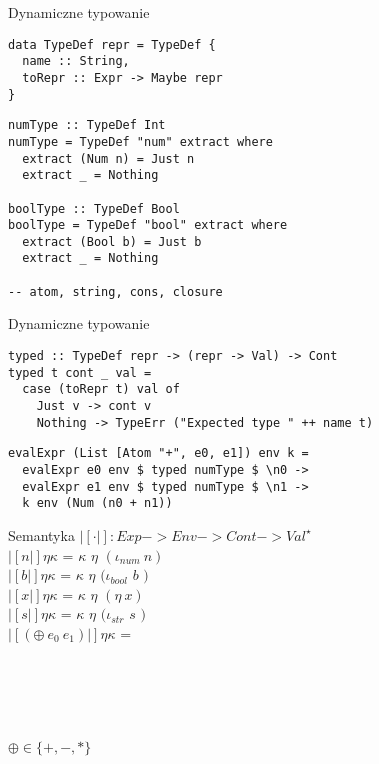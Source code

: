 \documentclass[12pt,serif]{beamer}
\begin{document}
\begin{frame}[fragile]{Dynamiczne typowanie}
\footnotesize \begin{verbatim}
data TypeDef repr = TypeDef {
  name :: String,
  toRepr :: Expr -> Maybe repr
}
\end{verbatim}
\pause
\footnotesize \begin{verbatim}
numType :: TypeDef Int
numType = TypeDef "num" extract where
  extract (Num n) = Just n
  extract _ = Nothing

boolType :: TypeDef Bool
boolType = TypeDef "bool" extract where
  extract (Bool b) = Just b
  extract _ = Nothing
  
-- atom, string, cons, closure
\end{verbatim}
\end{frame}

\begin{frame}[fragile]{Dynamiczne typowanie}
\footnotesize \begin{verbatim}
typed :: TypeDef repr -> (repr -> Val) -> Cont
typed t cont _ val =
  case (toRepr t) val of
    Just v -> cont v
    Nothing -> TypeErr ("Expected type " ++ name t)
\end{verbatim}
\pause
\footnotesize \begin{verbatim}
evalExpr (List [Atom "+", e0, e1]) env k =
  evalExpr e0 env $ typed numType $ \n0 ->
  evalExpr e1 env $ typed numType $ \n1 ->
  k env (Num (n0 + n1))
\end{verbatim}
\end{frame}


\begin{frame}{Semantyka}
$|[ \cdot |]: Exp -> Env -> Cont -> Val^{\star}$ \newline
\\
$|[n|] \eta \kappa$ = $\kappa$ $\eta$ $(\iota_{num}~n)$ \\
$|[b|] \eta \kappa$ = $\kappa$ $\eta$ $(\iota_{bool}$ $b$ $)$ \\
$|[x|] \eta \kappa$ = $\kappa$ $\eta$ $(\eta~x)$ \\
$|[s|] \eta \kappa$ = $\kappa$ $\eta$ $(\iota_{str}$ $s$ $)$ \newline
\\
$|[(\oplus~e_0~e_1)|] \eta \kappa$ = \\
\hspace{1em}{$|[e_0|]$ $\eta$ ($\lambda \eta_0 n_0$ .} \\
\hspace{2em}{$|[e_1|]$ $\eta$ ($\lambda \eta_1 n_1$ .} \\
 \\
 \\
 \newline
\\
$\oplus \in \{+,-,*\}$
\end{frame}
\end{document}
